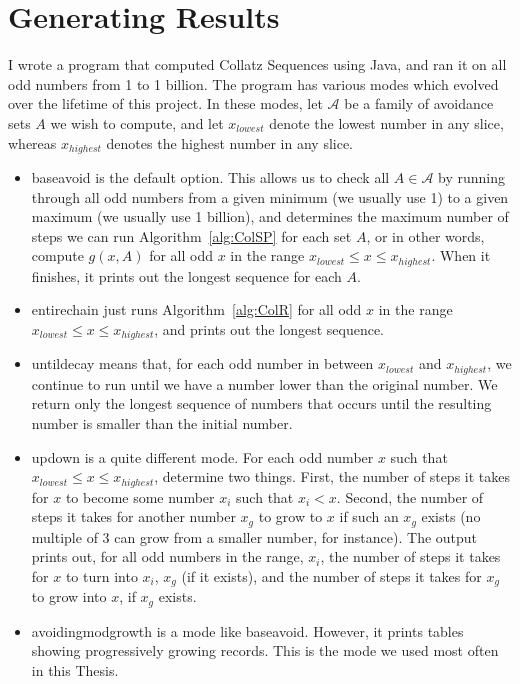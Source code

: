 \section{Generating Results} \label{subsec:algcomp}
I wrote a program that computed Collatz Sequences using Java, and ran it on all odd numbers from 1 to 1 billion. The program has various modes which evolved over the lifetime of this project. In these modes, let $\mathcal{A}$ be a family of avoidance sets $A$ we wish to compute, and let $x_{lowest}$ denote the lowest number in any slice, whereas $x_{highest}$ denotes the highest number in any slice.
\begin{itemize}
    \item baseavoid is the default option. This allows us to check all $A \in \mathcal{A}$ by running through all odd numbers from a given minimum (we usually use 1) to a given maximum (we usually use 1 billion), and determines the maximum number of steps we can run Algorithm~\ref{alg:ColSP} for each set $A$, or in other words, compute $g(x,A)$ for all odd $x$ in the range $x_{lowest} \leq x \leq x_{highest}$. When it finishes, it prints out the longest sequence for each $A$.
    \item entirechain just runs Algorithm~\ref{alg:ColR} for all odd $x$ in the range $x_{lowest} \leq x \leq x_{highest}$, and prints out the longest sequence.
    \item untildecay means that, for each odd number in between $x_{lowest}$ and $x_{highest}$, we continue to run until we have a number lower than the original number. We return only the longest sequence of numbers that occurs until the resulting number is smaller than the initial number.
    \item updown is a quite different mode. For each odd number $x$ such that $x_{lowest}\leq x \leq x_{highest}$, determine two things. First, the number of steps it takes for $x$ to become some number $x_i$ such that $x_i < x$. Second, the number of steps it takes for another number $x_g$ to grow to $x$ if such an $x_g$ exists (no multiple of 3 can grow from a smaller number, for instance). The output prints out, for all odd numbers in the range, $x_i$, the number of steps it takes for $x$ to turn into $x_i$, $x_g$ (if it exists), and the number of steps it takes for $x_g$ to grow into $x$, if $x_g$ exists.
    \item avoidingmodgrowth is a mode like baseavoid. However, it prints tables showing progressively growing records. This is the mode we used most often in this Thesis.
\end{itemize}
